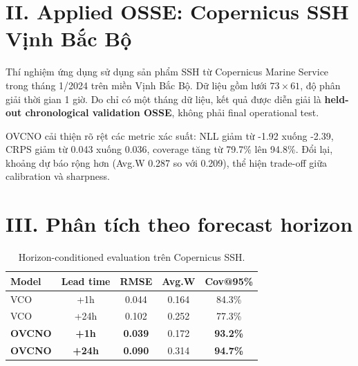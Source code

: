 \documentclass[a4paper, 12pt]{article}
\begin{document}
\section*{II. Applied OSSE: Copernicus SSH Vịnh Bắc Bộ}

Thí nghiệm ứng dụng sử dụng sản phẩm SSH từ Copernicus Marine Service trong tháng 1/2024 trên miền Vịnh Bắc Bộ. Dữ liệu gồm lưới $73 \times 61$, độ phân giải thời gian 1 giờ. Do chỉ có một tháng dữ liệu, kết quả được diễn giải là \textbf{held-out chronological validation OSSE}, không phải final operational test.

\begin{table}[H]
\centering
\caption{Kết quả trên Copernicus SSH Gulf of Tonkin.}
\end{table}

OVCNO cải thiện rõ rệt các metric xác suất: NLL giảm từ -1.92 xuống -2.39, CRPS giảm từ 0.043 xuống 0.036, coverage tăng từ 79.7\% lên 94.8\%. Đổi lại, khoảng dự báo rộng hơn (Avg.W 0.287 so với 0.209), thể hiện trade-off giữa calibration và sharpness.

\section*{III. Phân tích theo forecast horizon}

\begin{table}[H]
\centering
\caption{Horizon-conditioned evaluation trên Copernicus SSH.}
\begin{tabular}{lcccc}
\toprule
\textbf{Model} & \textbf{Lead time} & \textbf{RMSE} & \textbf{Avg.W} & \textbf{Cov@95\%} \\
\midrule
VCO & +1h & 0.044 & 0.164 & 84.3\% \\
VCO & +24h & 0.102 & 0.252 & 77.3\% \\
\textbf{OVCNO} & \textbf{+1h} & \textbf{0.039} & 0.172 & \textbf{93.2\%} \\
\textbf{OVCNO} & \textbf{+24h} & \textbf{0.090} & 0.314 & \textbf{94.7\%} \\
\bottomrule
\end{tabular}
\end{table}
\end{document}
